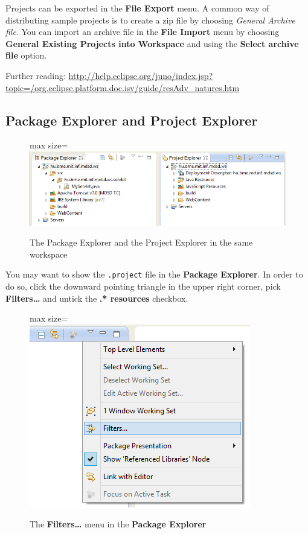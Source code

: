 \documentclass[]{report}
\let\Oldincludegraphics\includegraphics
\renewcommand{\includegraphics}[1]{
\begin{adjustbox}{max size={\textwidth}{\textheight}}
    \Oldincludegraphics[scale=0.6]{#1}%
\end{adjustbox}
}
\begin{document}
Projects can be exported in the \textbf{File \textbar{} Export} menu. A
common way of distributing sample projects is to create a zip file by
choosing \emph{General \textbar{} Archive file}. You can import an
archive file in the \textbf{File \textbar{} Import} menu by choosing
\textbf{General \textbar{} Existing Projects into Workspace} and using
the \textbf{Select archive file} option.

Further reading:
\url{http://help.eclipse.org/juno/index.jsp?topic=/org.eclipse.platform.doc.isv/guide/resAdv_natures.htm}

\subsection{Package Explorer and Project Explorer}

\begin{figure}[htbp]
\centering
\includegraphics{img/eclipse_basics/package_vs_project_explorer.png}
\caption{The Package Explorer and the Project Explorer in the same
workspace}
\end{figure}

You may want to show the \texttt{.project} file in the \textbf{Package
Explorer}. In order to do so, click the downward pointing triangle in
the upper right corner, pick \textbf{Filters\ldots{}} and untick the
\textbf{.* resources} checkbox.

\begin{figure}[htbp]
\centering
\includegraphics{img/eclipse_basics/package_explorer_filters.png}
\caption{The \textbf{Filters\ldots{}} menu in the \textbf{Package
Explorer}}
\end{figure}
\end{document}

